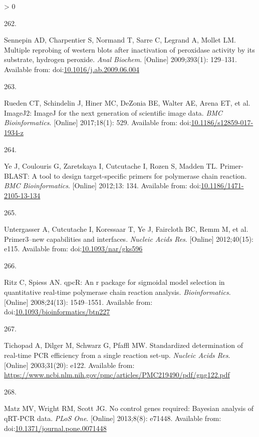 \documentclass[twoside,10pt]{gihclass} %
\newlength{\cslhangindent}
\newlength{\csllabelwidth}
\newenvironment{CSLReferences}[3] %
 {%
  \setlength{\parindent}{0pt}
  \ifodd #1 \everypar{\setlength{\hangindent}{\cslhangindent}}\ignorespaces\fi
  \ifnum #2 > 0
  \setlength{\parskip}{#2\baselineskip}
  \fi
 }%
 {}
\newcommand{\CSLLeftMargin}[1]{\parbox[t]{\maxof{\widthof{#1}}{\csllabelwidth}}{#1}}
\newcommand{\CSLRightInline}[1]{\parbox[t]{\linewidth}{#1}}
\begin{document}
\begin{CSLReferences}{0}{0}
\leavevmode\hypertarget{ref-RN1930}{}%
\CSLLeftMargin{262. }
\CSLRightInline{Sennepin AD, Charpentier S, Normand T, Sarre C, Legrand A, Mollet LM. Multiple reprobing of western blots after inactivation of peroxidase activity by its substrate, hydrogen peroxide. \emph{Anal Biochem}. {[}Online{]} 2009;393(1): 129--131. Available from: doi:\href{https://doi.org/10.1016/j.ab.2009.06.004}{10.1016/j.ab.2009.06.004}}

\leavevmode\hypertarget{ref-RN2259}{}%
\CSLLeftMargin{263. }
\CSLRightInline{Rueden CT, Schindelin J, Hiner MC, DeZonia BE, Walter AE, Arena ET, et al. ImageJ2: ImageJ for the next generation of scientific image data. \emph{BMC Bioinformatics}. {[}Online{]} 2017;18(1): 529. Available from: doi:\href{https://doi.org/10.1186/s12859-017-1934-z}{10.1186/s12859-017-1934-z}}

\leavevmode\hypertarget{ref-RN1815}{}%
\CSLLeftMargin{264. }
\CSLRightInline{Ye J, Coulouris G, Zaretskaya I, Cutcutache I, Rozen S, Madden TL. Primer-BLAST: A tool to design target-specific primers for polymerase chain reaction. \emph{BMC Bioinformatics}. {[}Online{]} 2012;13: 134. Available from: doi:\href{https://doi.org/10.1186/1471-2105-13-134}{10.1186/1471-2105-13-134}}

\leavevmode\hypertarget{ref-RN1816}{}%
\CSLLeftMargin{265. }
\CSLRightInline{Untergasser A, Cutcutache I, Koressaar T, Ye J, Faircloth BC, Remm M, et al. Primer3--new capabilities and interfaces. \emph{Nucleic Acids Res}. {[}Online{]} 2012;40(15): e115. Available from: doi:\href{https://doi.org/10.1093/nar/gks596}{10.1093/nar/gks596}}

\leavevmode\hypertarget{ref-RN1768}{}%
\CSLLeftMargin{266. }
\CSLRightInline{Ritz C, Spiess AN. qpcR: An r package for sigmoidal model selection in quantitative real-time polymerase chain reaction analysis. \emph{Bioinformatics}. {[}Online{]} 2008;24(13): 1549--1551. Available from: doi:\href{https://doi.org/10.1093/bioinformatics/btn227}{10.1093/bioinformatics/btn227}}

\leavevmode\hypertarget{ref-RN1934}{}%
\CSLLeftMargin{267. }
\CSLRightInline{Tichopad A, Dilger M, Schwarz G, Pfaffl MW. Standardized determination of real-time PCR efficiency from a single reaction set-up. \emph{Nucleic Acids Res}. {[}Online{]} 2003;31(20): e122. Available from: \url{https://www.ncbi.nlm.nih.gov/pmc/articles/PMC219490/pdf/gng122.pdf}}

\leavevmode\hypertarget{ref-RN1964}{}%
\CSLLeftMargin{268. }
\CSLRightInline{Matz MV, Wright RM, Scott JG. No control genes required: Bayesian analysis of qRT-PCR data. \emph{PLoS One}. {[}Online{]} 2013;8(8): e71448. Available from: doi:\href{https://doi.org/10.1371/journal.pone.0071448}{10.1371/journal.pone.0071448}}


\end{CSLReferences}
\end{document}
